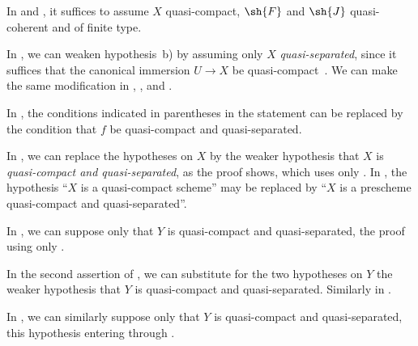 \begin{env}[1.7.6]
\label{IV.1.7.6}
In  and , it suffices to assume $X$ quasi-compact, $\sh{F}$ and $\sh{J}$ quasi-coherent and of finite type.
\end{env}

\begin{env}[1.7.7]
\label{IV.1.7.7}
In , we can weaken hypothesis~b) by assuming only $X$ \emph{quasi-separated}, since it suffices that the canonical immersion $U\to X$ be quasi-compact~.
We can make the same modification in , , and .
\end{env}

\begin{env}[1.7.8]
\label{IV.1.7.8}
In , the conditions indicated in parentheses in the statement can be replaced by the condition that $f$ be quasi-compact and quasi-separated.
\end{env}

\begin{env}[1.7.9]
\label{IV.1.7.9}
In , we can replace the hypotheses on $X$ by the weaker hypothesis that $X$ is \emph{quasi-compact and quasi-separated}, as the proof shows, which uses only .
In , the hypothesis ``$X$ is a quasi-compact scheme'' may be replaced by ``$X$ is a prescheme quasi-compact and quasi-separated''.
\end{env}

\begin{env}[1.7.10]
\label{IV.1.7.10}
In , we can suppose only that $Y$ is quasi-compact and quasi-separated, the proof using only .
\end{env}

\begin{env}[1.7.11]
\label{IV.1.7.11}
In the second assertion of , we can substitute for the two hypotheses on $Y$ the weaker hypothesis that $Y$ is quasi-compact and quasi-separated.
Similarly in .
\end{env}

\begin{env}[1.7.12]
\label{IV.1.7.12}
In , we can similarly suppose only that $Y$ is quasi-compact and quasi-separated, this hypothesis entering through .
\end{env}

